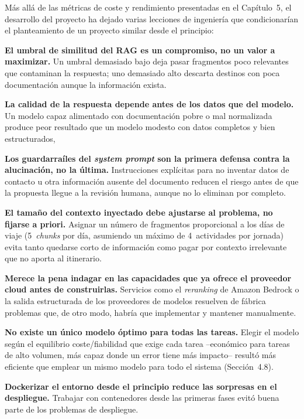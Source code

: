 \clearpage
{}
Más allá de las métricas de coste y rendimiento presentadas en el Capítulo~5, el desarrollo del proyecto ha dejado varias lecciones de ingeniería que condicionarían el planteamiento de un proyecto similar desde el principio:

\begin{tfmbullets}
\item \textbf{El umbral de similitud del RAG es un compromiso, no un valor a maximizar.} Un umbral demasiado bajo deja pasar fragmentos poco relevantes que contaminan la respuesta; uno demasiado alto descarta destinos con poca documentación aunque la información exista. 
\item \textbf{La calidad de la respuesta depende antes de los datos que del modelo.} Un modelo capaz alimentado con documentación pobre o mal normalizada produce peor resultado que un modelo modesto con datos completos y bien estructurados,
\item \textbf{Los guardarraíles del \textit{system prompt} son la primera defensa contra la alucinación, no la última.} Instrucciones explícitas para no inventar datos de contacto u otra información ausente del documento reducen el riesgo antes de que la propuesta llegue a la revisión humana, aunque no lo eliminan por completo.
\item \textbf{El tamaño del contexto inyectado debe ajustarse al problema, no fijarse a priori.} Asignar un número de fragmentos proporcional a los días de viaje (5~\textit{chunks} por día, asumiendo un máximo de 4~actividades por jornada) evita tanto quedarse corto de información como pagar por contexto irrelevante que no aporta al itinerario.
\item \textbf{Merece la pena indagar en las capacidades que ya ofrece el proveedor cloud antes de construirlas.} Servicios como el \textit{reranking} de Amazon Bedrock o la salida estructurada de los proveedores de modelos resuelven de fábrica problemas que, de otro modo, habría que implementar y mantener manualmente.
\item \textbf{No existe un único modelo óptimo para todas las tareas.} Elegir el modelo según el equilibrio coste/fiabilidad que exige cada tarea --económico para tareas de alto volumen, más capaz donde un error tiene más impacto-- resultó más eficiente que emplear un mismo modelo para todo el sistema (Sección~4.8).
\item \textbf{Dockerizar el entorno desde el principio reduce las sorpresas en el despliegue.} Trabajar con contenedores desde las primeras fases evitó buena parte de los problemas de despliegue.
\end{tfmbullets}

